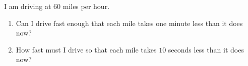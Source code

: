 I am driving at $60$ miles per hour.
\begin{enumerate}
\item[(a)] Can I drive fast enough that each mile takes one minute less than it does now?
\item[(b)] How fast must I drive so that each mile takes $10$ seconds less than it does now?
\end{enumerate}
